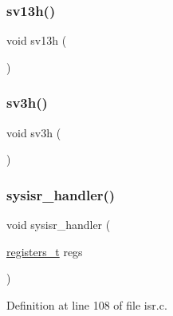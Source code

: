 \subsubsection{\texorpdfstring{sv13h()}{sv13h()}}
{\footnotesize\ttfamily void sv13h (\begin{DoxyParamCaption}{ }\end{DoxyParamCaption})}

\mbox{\label{a00107_ad118f86f4af40a3b4b94bc7c4977e762_ad118f86f4af40a3b4b94bc7c4977e762}} 
\subsubsection{\texorpdfstring{sv3h()}{sv3h()}}
{\footnotesize\ttfamily void sv3h (\begin{DoxyParamCaption}{ }\end{DoxyParamCaption})}

\mbox{\label{a00107_abd1fa375737cd5ecd84c082738e3b195_abd1fa375737cd5ecd84c082738e3b195}} 
\subsubsection{\texorpdfstring{sysisr\+\_\+handler()}{sysisr\_handler()}}
{\footnotesize\ttfamily void sysisr\+\_\+handler (\begin{DoxyParamCaption}\item[{\hyperlink{a00134_adf58dbaf6139b4957c348711f2026957_adf58dbaf6139b4957c348711f2026957}{registers\+\_\+t}}]{regs }\end{DoxyParamCaption})}



Definition at line 108 of file isr.\+c.


